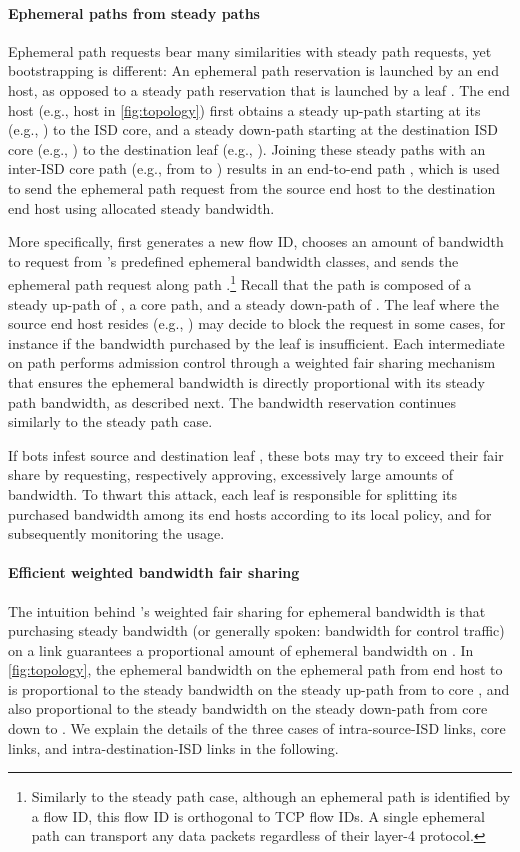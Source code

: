 \paragraph{Ephemeral paths from steady paths} Ephemeral path requests bear many
similarities with steady path requests, yet bootstrapping is different: An
ephemeral path reservation is launched by an end host, as opposed to a steady
path reservation that is launched by a leaf \AD. The end host (e.g., host  in
\autoref{fig:topology}) first obtains a steady up-path starting at its \AD
(e.g., ) to the ISD core, and a steady down-path starting at the
destination ISD core (e.g., ) to the destination leaf \AD (e.g.,
).  Joining these steady paths with an inter-ISD core path (e.g., from
 to ) results in an end-to-end path , which is used to
send the ephemeral path request from the source end host  to the destination
end host  using allocated steady bandwidth.

More specifically,  first generates a new flow ID, chooses an amount of
bandwidth to request from \name's predefined ephemeral bandwidth classes, and
sends the ephemeral path request along path .\footnote{Similarly to the
steady path case, although an ephemeral path is identified by a flow ID, this
flow ID is orthogonal to TCP flow IDs. A single ephemeral path can transport any
data packets regardless of their layer-4 protocol.} Recall that the path is
composed of a steady up-path of , a core path, and a steady down-path of
.  The leaf \AD where the source end host resides (e.g., ) may decide
to block the request in some cases, for instance if the bandwidth purchased by
the leaf \AD is insufficient. Each intermediate \AD on path  performs admission
control through a weighted fair sharing mechanism that ensures the ephemeral
bandwidth is directly proportional with its steady path bandwidth, as described
next. The bandwidth reservation continues similarly to the steady path case.


If bots infest source and destination leaf \ADs, these bots may try to exceed
their fair share by requesting, respectively approving, excessively large
amounts of bandwidth. To thwart this attack, each leaf \AD is responsible for
splitting its purchased bandwidth among its end hosts according to its local
policy, and for subsequently monitoring the usage.


\paragraph{Efficient weighted bandwidth fair sharing} The intuition behind
\name's weighted fair sharing for ephemeral bandwidth is that purchasing steady
bandwidth (or generally spoken: bandwidth for control traffic) on a link 
guarantees a proportional amount of ephemeral bandwidth on . In
\autoref{fig:topology}, the ephemeral bandwidth on the ephemeral path from end
host  to  is proportional to the steady bandwidth on the steady up-path
from  to core , and also proportional to the steady bandwidth on
the steady down-path from core  down to .
We explain the details of the three cases of intra-source-ISD links, core
links, and intra-destination-ISD links in the following.

